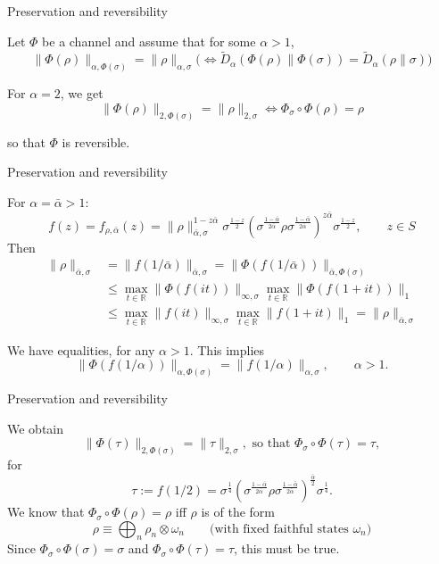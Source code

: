 \documentclass[mathserif]{beamer}
\newcommand{\<}{\langle}
\renewcommand{\>}{\rangle}
\begin{document}
\begin{frame}{Preservation and reversibility}

Let $\Phi$ be a channel and assume that for some $\alpha>1$,
\[
\|\Phi(\rho)\|_{\alpha,\Phi(\sigma)}=\|\rho\|_{\alpha,\sigma}\biggl(\iff \tilde
D_\alpha(\Phi(\rho)\|\Phi(\sigma))=\tilde D_\alpha(\rho\|\sigma)\biggr)
\]

\bigskip
 For $\alpha=2$, we get 
\[
\|\Phi(\rho)\|_{2,\Phi(\sigma)}=\|\rho\|_{2,\sigma}\iff \Phi_\sigma\circ\Phi(\rho)=\rho
\]

so that $\Phi$ is reversible.

\end{frame}


\begin{frame}{Preservation and reversibility}

For  $\alpha=\bar \alpha>1$:
\[
f(z)=f_{\rho,\bar\alpha}(z)=
\|\rho\|_{\bar\alpha,\sigma}^{1-z\bar\alpha}\sigma^{\frac{1-z}2}\left(\sigma^{\frac{1-\bar\alpha}{2\bar\alpha}}\rho\sigma^{\frac{1-\bar\alpha}{2\bar\alpha}}\right)^{z\bar\alpha}\sigma^{\frac{1-z}2},\qquad
z\in S
\]
Then
\begin{align*}
\|\rho\|_{\bar\alpha,\sigma}&=\|f(1/\bar\alpha)\|_{\bar\alpha,\sigma}=\|\Phi(f(1/\bar\alpha))\|_{\bar\alpha,\Phi(\sigma)}\\
&\le 
\max_{t\in \mathbb R}
\|\Phi(f(it))\|_{\infty,\sigma}\max_{t\in \mathbb R}\|\Phi(f(1+it))\|_1\\
&\le \max_{t\in \mathbb R}
\|f(it)\|_{\infty,\sigma}\max_{t\in \mathbb R}\|f(1+it)\|_1=\|\rho\|_{\bar\alpha,\sigma}
\end{align*}

We have equalities, for any $\alpha>1$. This implies
\[
\|\Phi(f(1/\alpha))\|_{\alpha,\Phi(\sigma)}=\|f(1/\alpha)\|_{\alpha,\sigma},\qquad
\alpha>1.
\]




\end{frame}


\begin{frame}{Preservation and reversibility}

We obtain
\[
\|\Phi(\tau)\|_{2,\Phi(\sigma)}=\|\tau\|_{2,\sigma}, \text{ so that }
\Phi_\sigma\circ\Phi(\tau)=\tau,
\]
for
\[
\tau:=f(1/2)=
\sigma^{\frac14}\left(\sigma^{\frac{1-\bar\alpha}{2\bar\alpha}}\rho\sigma^{\frac{1-\bar\alpha}{2\bar\alpha}}
\right)^{\frac{\bar\alpha}2}\sigma^{\frac14}.
\]
We know that $\Phi_\sigma\circ\Phi(\rho)=\rho$ iff $\rho$ is of the form
\[
\rho\equiv \bigoplus_n \rho_n\otimes \omega_n\qquad \text{(with fixed faithful states $\omega_n$)}
\]
Since  $\Phi_\sigma\circ\Phi(\sigma)=\sigma$ and $\Phi_\sigma\circ\Phi(\tau)=\tau$, this
must be true.


\end{frame}
\end{document}
